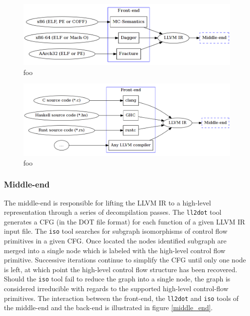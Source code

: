 \documentclass[12pt, a4paper]{article}
\begin{document}

\begin{figure}[htbp]
	\begin{center}
		\includegraphics[width=\textwidth]{inc/front-end_binary.png}
		\caption{foo}
		\label{binary_to_llvm}
	\end{center}
\end{figure}

\begin{figure}[htbp]
	\begin{center}
		\includegraphics[width=\textwidth]{inc/front-end_source.png}
		\caption{foo}
		\label{source_to_llvm}
	\end{center}
\end{figure}

\subsubsection{Middle-end}


The middle-end is responsible for lifting the LLVM IR to a high-level representation through a series of decompilation passes. The \texttt{ll2dot} tool generates a CFG (in the DOT file format) for each function of a given LLVM IR input file. The \texttt{iso} tool searches for subgraph isomorphisms of control flow primitives in a given CFG. Once located the nodes identified subgraph are merged into a single node which is labeled with the high-level control flow primitive. Successive iterations continue to simplify the CFG until only one node is left, at which point the high-level control flow structure has been recovered. Should the \texttt{iso} tool fail to reduce the graph into a single node, the graph is considered irreducible with regards to the supported high-level control-flow primitives. The interaction between the front-end, the \texttt{ll2dot} and \texttt{iso} tools of the middle-end and the back-end is illustrated in figure \ref{middle_end}.
\end{document}
